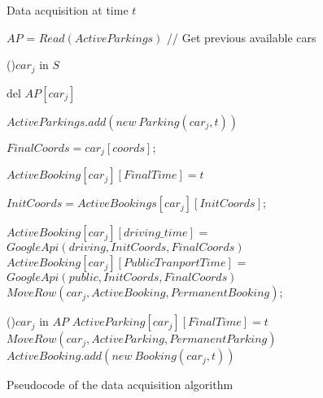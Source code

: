 \begin{figure}[t!]
 \removelatexerror
 \scriptsize
  \begin{algorithm}[H]
   	\caption{Data acquisition at time $t$}
	\BlankLine

	$AP$ = $Read(ActiveParkings)$ // Get previous available cars
	
	\For(){$car_j$ in $S$}
	{
		{
			del $AP[car_j]$\;
		}
		\Else
		{
			$ActiveParkings.add(new~Parking(car_j,t))$\;		
			{
				$FinalCoords = car_j[coords];$
				
				$ActiveBooking[car_j][FinalTime] = t$\;
				
				$InitCoords = ActiveBookings[car_j][InitCoords];$	
						
				{
					$ActiveBooking[car_j][driving\_time]$ = $GoogleApi(driving,InitCoords,FinalCoords)$\;
					$ActiveBooking[car_j][PublicTranportTime]$ = $GoogleApi(public,InitCoords,FinalCoords)$\;
				}
				$MoveRow(car_j,ActiveBooking,PermanentBooking)$;
			}
			}
	}
	\For(){$car_j$ in $AP$}
	{
		$ActiveParking[car_j][FinalTime] = t$\;
		$MoveRow(car_j,ActiveParking,PermanentParking)$\;
		$ActiveBooking.add(new~Booking(car_j,t))$\;		
	}
  \end{algorithm}
   \caption{Pseudocode of the data acquisition algorithm}\label{pseudocodeCarInfoUpdate}
\end{figure}

